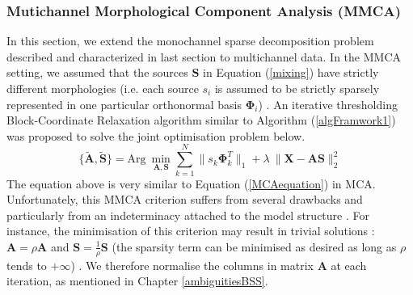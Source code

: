 \subsubsection{Mutichannel Morphological Component Analysis (MMCA)}
In this section, we extend the monochannel sparse decomposition problem described and characterized in last section to multichannel data. In the MMCA setting, we assumed that the sources $\mathbf{S}$ in Equation (\ref{mixing}) have strictly different morphologies (i.e. each source $s_i$ is assumed to be strictly sparsely represented in one particular orthonormal basis $\mathbf{\Phi}_i$) \cite{BobinJ_2007SaMD}. An iterative thresholding Block-Coordinate Relaxation algorithm similar to Algorithm (\ref{algFramwork1}) was proposed to solve the joint optimisation problem below.
\begin{equation}
    \{\mathbf{\tilde{A},\tilde{S}}\} = \text{Arg} \: \min_{\mathbf{A},\mathbf{S}}\sum_{k=1}^N \lVert s_k \mathbf{\Phi}_k^T \rVert_{1} + \lambda \:\lVert \mathbf{X} - \mathbf{AS} \rVert^2_2
    \label{MMCAequation}
\end{equation}
The equation above is very similar to Equation (\ref{MCAequation}) in MCA. Unfortunately, this MMCA criterion suffers from several drawbacks and particularly from an indeterminacy attached to the model structure \cite{BobinJ_2007SaMD}. For instance, the minimisation of this criterion may result in trivial solutions : $\mathbf{A} = \rho \mathbf{A}$ and $\mathbf{S} = \frac{1}{\rho} \mathbf{S}$ (the sparsity term can be minimised as desired as long as $\rho$ tends to $+\infty$) \cite{BobinJ_2007SaMD}. We therefore normalise the columns in matrix $\mathbf{A}$ at each iteration, as mentioned in Chapter \ref{ambiguitiesBSS}.

